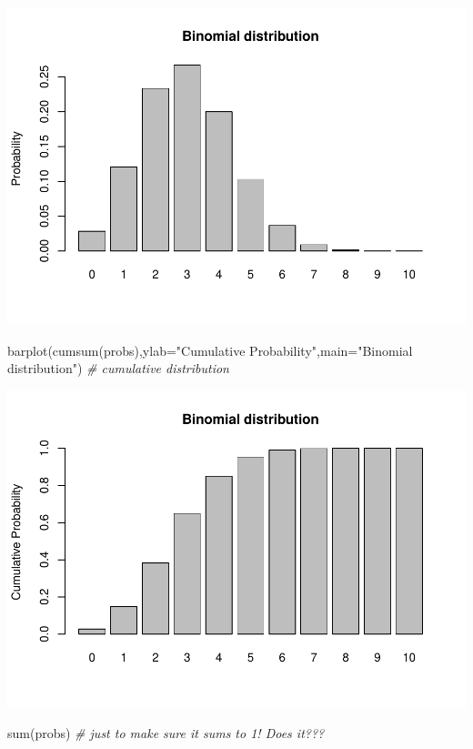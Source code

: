 \documentclass[
]{article}
\newenvironment{Shaded}{\begin{snugshade}}{\end{snugshade}}
\newcommand{\AttributeTok}[1]{\textcolor[rgb]{0.77,0.63,0.00}{#1}}
\newcommand{\CommentTok}[1]{\textcolor[rgb]{0.56,0.35,0.01}{\textit{#1}}}
\newcommand{\FunctionTok}[1]{\textcolor[rgb]{0.00,0.00,0.00}{#1}}
\newcommand{\NormalTok}[1]{#1}
\newcommand{\StringTok}[1]{\textcolor[rgb]{0.31,0.60,0.02}{#1}}
\begin{document}
\includegraphics{LECTURE2_files/figure-latex/unnamed-chunk-20-1.pdf}

\begin{Shaded}
\begin{Highlighting}[]
\FunctionTok{barplot}\NormalTok{(}\FunctionTok{cumsum}\NormalTok{(probs),}\AttributeTok{ylab=}\StringTok{"Cumulative Probability"}\NormalTok{,}\AttributeTok{main=}\StringTok{"Binomial distribution"}\NormalTok{)   }\CommentTok{\# cumulative distribution}
\end{Highlighting}
\end{Shaded}

\includegraphics{LECTURE2_files/figure-latex/unnamed-chunk-20-2.pdf}

\begin{Shaded}
\begin{Highlighting}[]
\FunctionTok{sum}\NormalTok{(probs)   }\CommentTok{\# just to make sure it sums to 1!  Does it???}
\end{Highlighting}
\end{Shaded}
\end{document}
